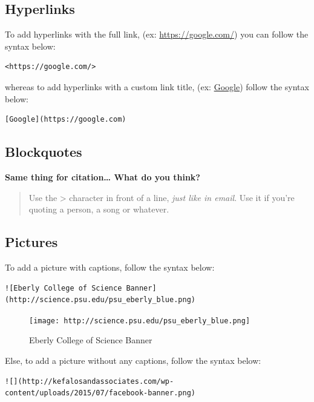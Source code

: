 \documentclass[]{book}
\theoremstyle{definition}
\theoremstyle{definition}
\theoremstyle{remark}
\begin{document}
\subsection{Hyperlinks}\label{hyperlinks}

To add hyperlinks with the full link, (ex: \url{https://google.com/})
you can follow the syntax below:

\begin{verbatim}
<https://google.com/>
\end{verbatim}

whereas to add hyperlinks with a custom link title, (ex:
\href{https://google.com}{Google}) follow the syntax below:

\begin{verbatim}
[Google](https://google.com)
\end{verbatim}

\subsection{Blockquotes}\label{blockquotes}

\textbf{Same thing for citation\ldots{} What do you think?}

\begin{quote}
Use the \textgreater{} character in front of a line, \emph{just like in
email}. Use it if you're quoting a person, a song or whatever.
\end{quote}

\subsection{Pictures}\label{pictures}

To add a picture with captions, follow the syntax below:

\begin{verbatim}
![Eberly College of Science Banner](http://science.psu.edu/psu_eberly_blue.png)
\end{verbatim}

\begin{figure}[htbp]
\centering
\texttt{[image: http://science.psu.edu/psu\_eberly\_blue.png]}
\caption{Eberly College of Science Banner}
\end{figure}

Else, to add a picture without any captions, follow the syntax below:

\begin{verbatim}
![](http://kefalosandassociates.com/wp-content/uploads/2015/07/facebook-banner.png)
\end{verbatim}
\end{document}
